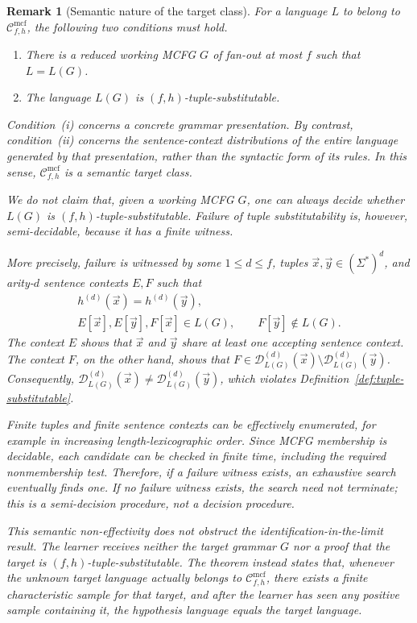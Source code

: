 \documentclass[11pt,a4paper]{article}
\newtheorem{remark}[theorem]{Remark}
\theoremstyle{remark}
\newcommand{\Cmcf}[2]{\mathcal{C}^{\mathrm{mcf}}_{#1,#2}}
\newcommand{\D}{\mathcal{D}}
\newcommand{\tuple}[1]{\vec{#1}}
\begin{document}
\begin{remark}[Semantic nature of the target class]
\label{rem:semantic-class}
For a language \(L\) to belong to \(\Cmcf{f}{h}\), the following two
conditions must hold.
\begin{enumerate}[label=(\roman*),leftmargin=*]
\item There is a reduced working MCFG \(G\) of fan-out at most \(f\) such that
      \(L=L(G)\).
\item The language \(L(G)\) is \((f,h)\)-tuple-substitutable.
\end{enumerate}
Condition~(i) concerns a concrete grammar presentation.  By contrast,
condition~(ii) concerns the sentence-context distributions of the entire
language generated by that presentation, rather than the syntactic form of its
rules.  In this sense, \(\Cmcf{f}{h}\) is a \emph{semantic target class}.

We do not claim that, given a working MCFG \(G\), one can always decide whether
\(L(G)\) is \((f,h)\)-tuple-substitutable.  Failure of tuple substitutability is,
however, semi-decidable, because it has a finite witness.

More precisely, failure is witnessed by some \(1\le d\le f\), tuples
\(\tuple x,\tuple y\in(\Sigma^*)^d\), and arity-\(d\) sentence contexts
\(E,F\) such that
\[
\begin{gathered}
  h^{(d)}(\tuple x)=h^{(d)}(\tuple y),\\
  E[\tuple x],E[\tuple y],F[\tuple x]\in L(G),
  \qquad F[\tuple y]\notin L(G).
\end{gathered}
\]
The context \(E\) shows that \(\tuple x\) and \(\tuple y\) share at least one
accepting sentence context.  The context \(F\), on the other hand, shows that
\(F\in\D_{L(G)}^{(d)}(\tuple x)\setminus
\D_{L(G)}^{(d)}(\tuple y)\).  Consequently,
\(\D_{L(G)}^{(d)}(\tuple x)\ne
\D_{L(G)}^{(d)}(\tuple y)\), which violates Definition~\ref{def:tuple-substitutable}.

Finite tuples and finite sentence contexts can be effectively enumerated, for
example in increasing length-lexicographic order.  Since MCFG membership is
decidable, each candidate can be checked in finite time, including the required
nonmembership test.  Therefore, if a failure witness exists, an exhaustive
search eventually finds one.  If no failure witness exists, the search need not
terminate; this is a semi-decision procedure, not a decision procedure.

This semantic non-effectivity does not obstruct the identification-in-the-limit
result.  The learner receives neither the target grammar \(G\) nor a proof that
the target is \((f,h)\)-tuple-substitutable.  The theorem instead states that,
whenever the unknown target language actually belongs to \(\Cmcf{f}{h}\), there
exists a finite characteristic sample for that target, and after the learner has
seen any positive sample containing it, the hypothesis language equals the
target language.


\end{remark}
\end{document}
